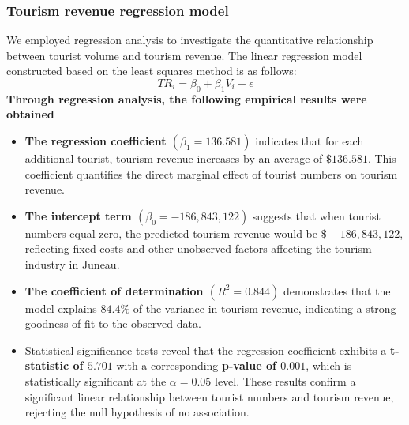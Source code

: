 \documentclass{mcmthesis}
\begin{document}
\subsubsection{Tourism revenue regression model}
We employed regression analysis to investigate the quantitative relationship between tourist volume and tourism revenue. The linear regression model constructed based on the least squares method is as follows:
\begin{equation}
  TR_i = \beta_0 + \beta_1 V_i + \epsilon
\end{equation}
\textbf{Through regression analysis, the following empirical results were obtained}
\begin{itemize}
  \item \textbf{The regression coefficient $(\beta_1 = 136.581)$}  indicates that for each additional tourist, tourism revenue increases by an average of $\$136.581$. This coefficient quantifies the direct marginal effect of tourist numbers on tourism revenue.
  
  \item \textbf{The intercept term $(\beta_0 = -186,843,122)$} suggests that when tourist numbers equal zero, the predicted tourism revenue would be $\$-186,843,122$, reflecting fixed costs and other unobserved factors affecting the tourism industry in Juneau.
  
  \item \textbf{The coefficient of determination $(R^2 = 0.844)$} demonstrates that the model explains $84.4\%$ of the variance in tourism revenue, indicating a strong goodness-of-fit to the observed data.
  
  \item Statistical significance tests reveal that the regression coefficient exhibits a \textbf{t-statistic of $5.701$} with a corresponding \textbf{p-value of $0.001$}, which is statistically significant at the $\alpha = 0.05$ level. These results confirm a significant linear relationship between tourist numbers and tourism revenue, rejecting the null hypothesis of no association. 
\end{itemize}
\end{document}
